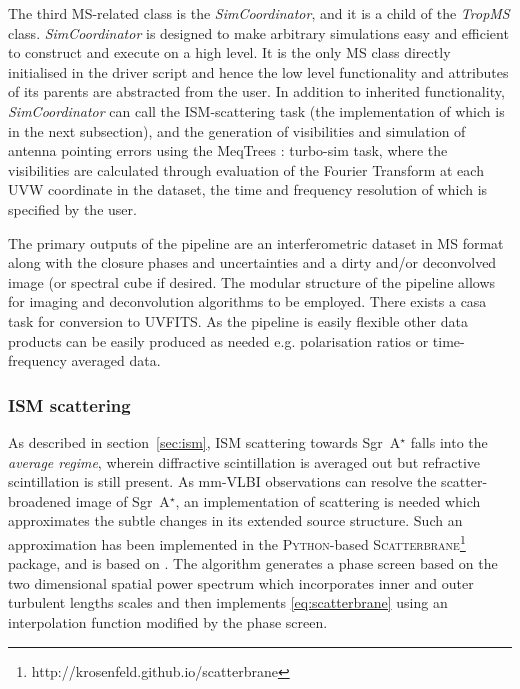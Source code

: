 The third MS-related class is the \emph{SimCoordinator}, and it is a child of the {\it TropMS} class. {\it SimCoordinator} is designed to make arbitrary simulations easy and efficient to construct and execute on a high level. It is the only MS class directly initialised in the driver script and hence the low level functionality and attributes of its parents are abstracted from the user. In addition to inherited functionality, {\it SimCoordinator} can call the ISM-scattering task (the implementation of which is in the next subsection), and the generation of visibilities and simulation of antenna pointing errors using the {\sc MeqTrees : turbo-sim} task, where the visibilities are calculated through evaluation of the Fourier Transform at each UVW coordinate in the dataset, the time and frequency resolution of which is specified by the user.
 
The primary outputs of the pipeline are an interferometric dataset in MS format along with the closure phases and uncertainties and a dirty and/or deconvolved image (or spectral cube if desired. The modular structure of the pipeline allows for imaging and deconvolution algorithms to be employed. There exists a {\sc casa} task for conversion to UVFITS. As the pipeline is easily flexible other data products can be easily produced as needed e.g. polarisation ratios or time-frequency averaged data.


\subsubsection{ISM scattering}

As described in section~\ref{sec:ism}, ISM scattering towards Sgr~A$^\star$ falls into the \emph{average regime}, wherein diffractive scintillation is averaged out but refractive scintillation is still present. As mm-VLBI observations can resolve the scatter-broadened image of Sgr~A$^\star$, an implementation of scattering is needed which approximates the subtle changes in its extended source structure. Such an approximation has been implemented in the \textsc{Python}-based \textsc{Scatterbrane}\footnote{http://krosenfeld.github.io/scatterbrane} package, and is based on \citet*{Johnson_2015a}. The algorithm generates a phase screen based on the two dimensional spatial power spectrum  \citep*[see][Appendix C]{Johnson_2015a} which incorporates inner and outer turbulent lengths scales and then implements \ref{eq:scatterbrane} using an interpolation function modified by the phase screen.


